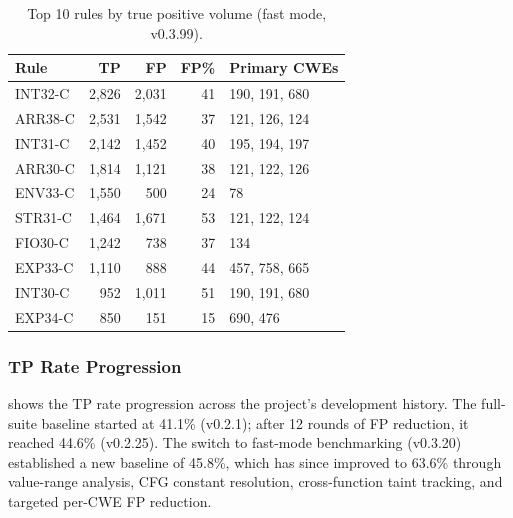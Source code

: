\documentclass[10pt,twocolumn,letterpaper]{article}
\begin{document}
\begin{table}[t]
\centering
\footnotesize
\begin{tabular}{@{}lrrrl@{}}
\toprule
\textbf{Rule} & \textbf{TP} & \textbf{FP} & \textbf{FP\%} & \textbf{Primary CWEs} \\
\midrule
INT32-C & 2,826 & 2,031 & 41 & 190, 191, 680 \\
ARR38-C & 2,531 & 1,542 & 37 & 121, 126, 124 \\
INT31-C & 2,142 & 1,452 & 40 & 195, 194, 197 \\
ARR30-C & 1,814 & 1,121 & 38 & 121, 122, 126 \\
ENV33-C & 1,550 & 500  & 24 & 78 \\
STR31-C & 1,464 & 1,671 & 53 & 121, 122, 124 \\
FIO30-C & 1,242 & 738  & 37 & 134 \\
EXP33-C & 1,110 & 888  & 44 & 457, 758, 665 \\
INT30-C & 952  & 1,011 & 51 & 190, 191, 680 \\
EXP34-C & 850  & 151  & 15 & 690, 476 \\
\bottomrule
\end{tabular}
\caption{Top 10 rules by true positive volume (fast mode, v0.3.99).}
\label{tab:top-rules}
\end{table}

\subsubsection{TP Rate Progression}

 shows the TP rate progression across
the project's development history.  The full-suite baseline started at
41.1\% (v0.2.1); after 12 rounds of FP reduction, it reached 44.6\%
(v0.2.25).  The switch to fast-mode benchmarking (v0.3.20) established
a new baseline of 45.8\%, which has since improved to 63.6\% through
value-range analysis, CFG constant resolution, cross-function taint
tracking, and targeted per-CWE FP reduction.
\end{document}
